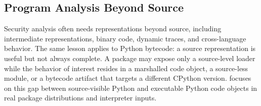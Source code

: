 \subsection{Program Analysis Beyond Source}

Security analysis often needs representations beyond source, including intermediate representations, binary code, dynamic traces, and cross-language behavior.  The same lesson applies to Python bytecode: a source representation is useful but not always complete.  A package may expose only a source-level loader while the behavior of interest resides in a marshalled code object, a source-less module, or a bytecode artifact that targets a different CPython version.  {\tech} focuses on this gap between source-visible Python and executable Python code objects in real package distributions and interpreter inputs.
